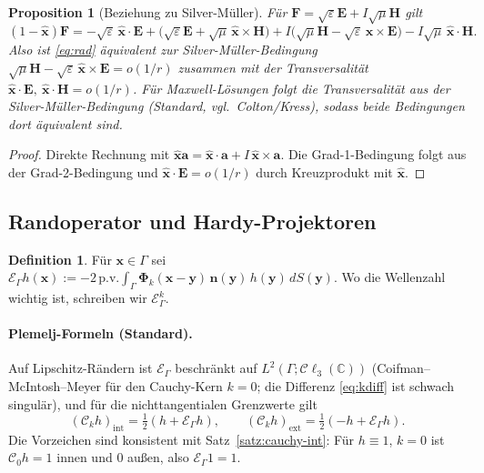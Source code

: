 \documentclass[11pt, a4paper]{article}
\newcommand{\mvec}[1]{\boldsymbol{#1}}
\newcommand{\clc}{\mathcal{C}\ell_{3}(\mathbb{C})}
\newcommand{\n}{\mvec{n}}
\newcommand{\xh}{\hat{\mvec{x}}}
\newcommand{\EG}{\mathcal{E}_\Gamma}
\theoremstyle{plain}
\newtheorem{prop}[satz]{Proposition}
\theoremstyle{definition}
\newtheorem{definition}[satz]{Definition}
\newcommand{\status}[1]{\hfill{\small\sffamily[#1]}}
\begin{document}
\begin{prop}[Beziehung zu Silver-Müller]\label{prop:sm}\status{bewiesen / Standard}
Für $\mvec{F} = \sqrt\varepsilon\mvec{E} + I\sqrt\mu\mvec{H}$ gilt
\[
  (1-\xh)\mvec{F} = -\sqrt\varepsilon\,\xh\cdot\mvec{E}
  + \big(\sqrt\varepsilon\mvec{E}+\sqrt\mu\,\xh\times\mvec{H}\big)
  + I\big(\sqrt\mu\mvec{H} - \sqrt\varepsilon\,\xh\times\mvec{E}\big)
  - I\sqrt\mu\,\xh\cdot\mvec{H}.
\]
Also ist \eqref{eq:rad} äquivalent zur Silver-Müller-Bedingung
$\sqrt\mu\mvec{H}-\sqrt\varepsilon\,\xh\times\mvec{E} = o(1/r)$ zusammen mit der
Transversalität $\xh\cdot\mvec{E},\ \xh\cdot\mvec{H} = o(1/r)$. Für
Maxwell-Lösungen folgt die Transversalität aus der Silver-Müller-Bedingung
(Standard, vgl.\ Colton/Kress), sodass beide Bedingungen dort äquivalent sind.
\end{prop}
\begin{proof}
Direkte Rechnung mit $\xh\mvec{a} = \xh\cdot\mvec{a} + I\,\xh\times\mvec{a}$. Die
Grad-1-Bedingung folgt aus der Grad-2-Bedingung und $\xh\cdot\mvec{E}=o(1/r)$ durch
Kreuzprodukt mit $\xh$.
\end{proof}

\subsection{Randoperator und Hardy-Projektoren}

\begin{definition}
Für $\mvec{x}\in\Gamma$ sei
$\EG h(\mvec{x}) := -2\,\mathrm{p.v.}\!\int_\Gamma \mvec{\Phi}_k(\mvec{x}-\mvec{y})\,\n(\mvec{y})\,
h(\mvec{y})\,dS(\mvec{y})$. Wo die Wellenzahl wichtig ist, schreiben wir $\EG^{k}$.
\end{definition}

\paragraph{Plemelj-Formeln (Standard).} Auf Lipschitz-Rändern ist $\EG$ beschränkt
auf $L^2(\Gamma;\clc)$ (Coifman--McIntosh--Meyer für den Cauchy-Kern $k=0$; die
Differenz \eqref{eq:kdiff} ist schwach singulär), und für die nichttangentialen
Grenzwerte gilt
\[
  (\mathcal{C}_kh)_{\mathrm{int}} = \tfrac12(h + \EG h),\qquad
  (\mathcal{C}_kh)_{\mathrm{ext}} = \tfrac12(-h + \EG h).
\]
Die Vorzeichen sind konsistent mit Satz~\ref{satz:cauchy-int}: Für $h\equiv1$,
$k=0$ ist $\mathcal{C}_0h = 1$ innen und $0$ außen, also $\EG 1 = 1$.
\end{document}

